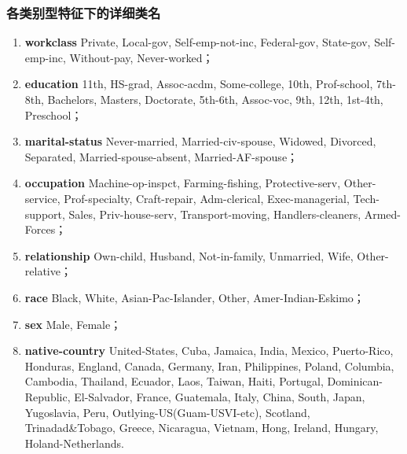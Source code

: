 \documentclass[12pt,a4paper]{article}
\theoremstyle{definition}
\begin{document}
\begin{appendix}
	\subsubsection{各类别型特征下的详细类名}
	\label{apd:classes}
	
	\begin{enumerate}
	
	\item \textbf{workclass} Private, Local-gov, Self-emp-not-inc, Federal-gov, State-gov, Self-emp-inc, Without-pay, Never-worked；
	
	\item \textbf{education} 11th, HS-grad, Assoc-acdm, Some-college, 10th, Prof-school, 7th-8th, Bachelors, Masters, Doctorate, 5th-6th, Assoc-voc, 9th, 12th, 1st-4th, Preschool；
	
	\item \textbf{marital-status} Never-married, Married-civ-spouse, Widowed, Divorced, Separated, Married-spouse-absent, Married-AF-spouse；
	
	\item \textbf{occupation} Machine-op-inspct, Farming-fishing, Protective-serv, Other-service, Prof-specialty, Craft-repair, Adm-clerical, Exec-managerial, Tech-support, Sales, Priv-house-serv, Transport-moving, Handlers-cleaners, Armed-Forces；
	
	\item \textbf{relationship} Own-child, Husband, Not-in-family, Unmarried, Wife, Other-relative；
	
	\item \textbf{race} Black, White, Asian-Pac-Islander, Other, Amer-Indian-Eskimo；
	
	\item \textbf{sex} Male, Female；
	
	\item \textbf{native-country} United-States, Cuba, Jamaica, India, Mexico, Puerto-Rico, Honduras, England, Canada, Germany, Iran, Philippines, Poland, Columbia, Cambodia, Thailand, Ecuador, Laos, Taiwan, Haiti, Portugal, Dominican-Republic, El-Salvador, France, Guatemala, Italy, China, South, Japan, Yugoslavia, Peru, Outlying-US(Guam-USVI-etc), Scotland, Trinadad\&Tobago, Greece, Nicaragua, Vietnam, Hong, Ireland, Hungary, Holand-Netherlands.
	       
	\end{enumerate}
	
\end{appendix}




\end{document}
